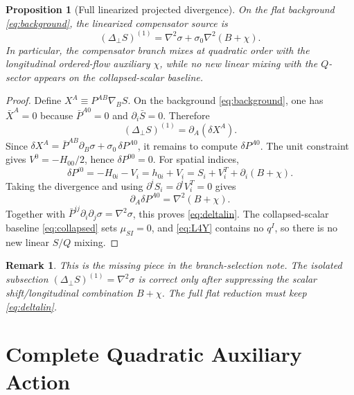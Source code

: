\documentclass[11pt]{article}
\newtheorem{proposition}{Proposition}
\newtheorem{remark}{Remark}
\begin{document}
\begin{proposition}[Full linearized projected divergence]
\label{prop:deltalin}
On the flat background \eqref{eq:background}, the linearized compensator source is
\begin{equation}
(\Delta_\perp S)^{(1)}
=
\nabla^2\sigma+\sigma_0\nabla^2(B+\chi).
\label{eq:deltalin}
\end{equation}
In particular, the compensator branch mixes at quadratic order with the longitudinal ordered-flow auxiliary \(\chi\), while no new linear mixing with the \(Q\)-sector appears on the collapsed-scalar baseline.
\end{proposition}

\begin{proof}
Define \(X^A\equiv P^{AB}\nabla_BS\). On the background \eqref{eq:background}, one has \(\bar X^A=0\) because \(\bar P^{A0}=0\) and \(\partial_i\bar S=0\). Therefore
\[
(\Delta_\perp S)^{(1)}
=
\partial_A(\delta X^A).
\]
Since \(\delta X^A=\bar P^{AB}\partial_B\sigma+\sigma_0\,\delta P^{A0}\), it remains to compute \(\delta P^{A0}\). The unit constraint gives \(V^0=-H_{00}/2\), hence \(\delta P^{00}=0\). For spatial indices,
\[
\delta P^{i0}
=
-H_{0i}-V_i
=
h_{0i}+V_i
=
S_i+V_i^T+\partial_i(B+\chi).
\]
Taking the divergence and using \(\partial^iS_i=\partial^iV_i^T=0\) gives
\[
\partial_A\delta P^{A0}
=
\nabla^2(B+\chi).
\]
Together with \(\bar P^{ij}\partial_i\partial_j\sigma=\nabla^2\sigma\), this proves \eqref{eq:deltalin}. The collapsed-scalar baseline \eqref{eq:collapsed} sets \(\mu_{SI}=0\), and \eqref{eq:L4Y} contains no \(q^I\), so there is no new linear \(S/Q\) mixing.
\end{proof}

\begin{remark}
This is the missing piece in the branch-selection note. The isolated subsection \((\Delta_\perp S)^{(1)}=\nabla^2\sigma\) is correct only after suppressing the scalar shift/longitudinal combination \(B+\chi\). The full flat reduction must keep \eqref{eq:deltalin}.
\end{remark}

\section{Complete Quadratic Auxiliary Action}
\end{document}
